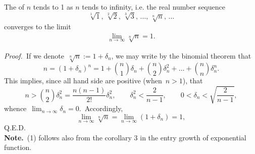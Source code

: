 \documentclass[12pt]{article}
\theoremstyle{definition}
\begin{document}
The  of $n$ tends to 1 as $n$ tends to infinity, i.e. the real number sequence
$$\sqrt[1]{1},\, \sqrt[2]{2},\,\sqrt[3]{3},\,\ldots,\,\sqrt[n]{n},\,\ldots$$
converges to the limit
\begin{align}
\lim_{n\to\infty}\sqrt[n]{n} = 1.
\end{align}

{\it Proof.}\, If we denote\, $\sqrt[n]{n} := 1+\delta_n$, we may write by the binomial theorem that
$$n = (1+\delta_n)^n = 1+{n\choose1}\delta_n+{n\choose2}\delta_n^2+\ldots+{n\choose n}\delta_n^n.$$
This implies, since all  hand side are positive (when\, $n > 1$), that
$$n > {n\choose2}\delta_n^2 = \frac{n(n\!-\!1)}{2!}\delta_n^2, 
\qquad \delta_n^2 < \frac{2}{n-1}, 
\qquad 0 < \delta_n < \sqrt{\frac{2}{n-1}},$$
whence\, $\displaystyle\lim_{n\to\infty}\delta_n = 0$.\, Accordingly, 
$$\lim_{n\to\infty}\sqrt[n]{n} = \lim_{n\to\infty}(1+\delta_n) = 1,$$
Q.E.D.\\

\textbf{Note.}\, (1) follows also from the corollary 3 in the entry growth of exponential function.


             

\end{document}

